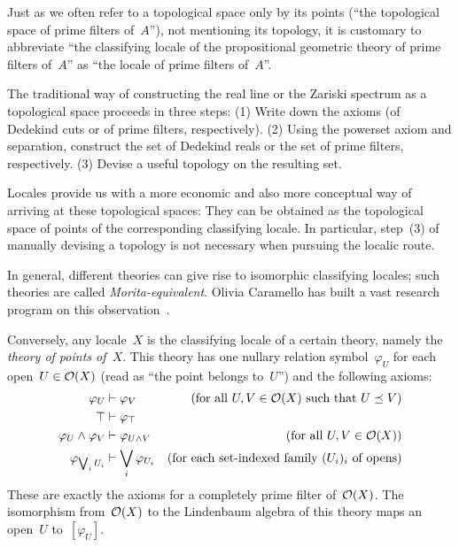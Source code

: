 \documentclass{ws-rv9x6}
\begin{document}
{Just as we often refer to a topological space only by its points (``the
topological space of prime filters of~$A$''), not mentioning its topology, it is
customary to abbreviate ``the classifying locale of the propositional geometric
theory of prime filters of~$A$'' as ``the locale of prime filters of~$A$''.

\begin{remark}\label{rem:traditional-spaces}
The traditional way of constructing the real line or the Zariski
spectrum as a topological space proceeds in three steps: (1) Write down the
axioms (of Dedekind cuts or of prime filters, respectively). (2) Using the powerset
axiom and separation, construct the set of Dedekind reals or the set
of prime filters, respectively. (3) Devise a useful topology on the resulting set.

Locales provide us with a more economic and also more conceptual way of
arriving at these topological spaces: They can be obtained as the topological
space of points of the corresponding classifying locale. In particular,
step~(3) of manually devising a topology is not necessary when pursuing the
localic route.
\end{remark}

In general, different theories can give rise to isomorphic classifying locales;
such theories are called \emph{Morita-equivalent}. Olivia Caramello has built a vast research program
on this observation~\cite{caramello:tst}.

Conversely, any locale~$X$ is the classifying locale of a certain theory, namely
the \emph{theory of points of~$X$}. This theory has one nullary relation
symbol~$\varphi_U$ for each open~$U \in \mathcal{O}(X)$ (read as ``the point belongs
to~$U$'') and the following axioms:
\begin{align*}
  \varphi_U &\vdash \varphi_V & \text{(for all~$U,V \in \mathcal{O}(X)$ such that~$U \preceq V$)} \\
  \top &\vdash \varphi_\top \\
  \varphi_U \wedge \varphi_V &\vdash \varphi_{U \wedge V} & \text{(for all~$U,V \in \mathcal{O}(X)$)} \\
  \varphi_{\bigvee_i U_i} &\vdash \bigvee_i \varphi_{U_i} & \text{(for each set-indexed family~$(U_i)_i$ of opens)}
\end{align*}
These are exactly the axioms for a completely prime filter of~$\mathcal{O}(X)$. The
isomorphism from~$\mathcal{O}(X)$ to the Lindenbaum algebra of this theory maps an
open~$U$ to~$[\varphi_U]$.

}
\end{document}
